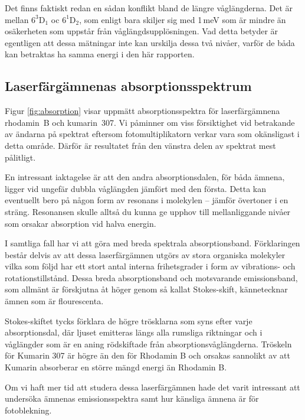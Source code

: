 \documentclass[11pt,a4paper]{article}
\begin{document}
Det finns faktiskt redan en sådan konflikt bland de längre
våglängderna. Det är mellan $6^3\mathrm{D}_1$ oc $6^1\mathrm{D}_2$,
som enligt \cite{NIST_levels} bara skiljer sig med 1\,meV som är
mindre än osäkerheten som uppstår från våglängdsupplösningen. Vad
detta betyder är egentligen att dessa mätningar inte kan urskilja
dessa två nivåer, varför de båda kan betraktas ha samma energi i den
här rapporten. 


\subsection{Laserfärgämnenas absorptionsspektrum}

Figur \ref{fig:absorption} visar uppmätt absorptionsspektra för
laserfärgämnena rhodamin~B och kumarin~307. Vi påminner om viss
försiktighet vid betrakande av ändarna på spektrat eftersom
fotomultiplikatorn verkar vara som okänsligast i detta område. Därför är
resultatet från den vänstra delen av spektrat mest pålitligt. 


En intressant iaktagelse är att den andra absorptionsdalen, för båda
ämnena, ligger vid ungefär dubbla våglängden jämfört med den
första. Detta kan eventuellt bero på någon form av resonans i
molekylen -- jämför övertoner i en sträng. Resonansen skulle alltså du
kunna ge upphov till mellanliggande nivåer som orsakar absorption vid
halva energin. 

I samtliga fall har vi att göra med breda spektrala
absorptionsband. Förklaringen består delvis av att dessa
laserfärgämnen utgörs av stora organiska molekyler vilka som följd har
ett stort antal interna frihetsgrader i form av vibrations- och
rotationstillstånd. Dessa breda absorptionsband och motsvarande
emissionsband, som allmänt är förskjutna åt höger genom så kallat
Stokes-skift, kännetecknar ämnen som är flourescenta. 

Stokes-skiftet tycks förklara de högre trösklarna som syns efter varje
absorptionsdal, där ljuset emitteras längs alla rumsliga riktningar
och i våglängder som är en aning rödskiftade från
absorptionsvåglängderna. Tröskeln för Kumarin 307 är högre än den för
Rhodamin B och orsakas sannolikt av att Kumarin absorberar en större
mängd energi än Rhodamin B. 

Om vi haft mer tid att studera dessa laserfärgämnen hade det varit
intressant att undersöka ämnenas emissionsspektra samt hur känsliga
ämnena är för fotoblekning.
\end{document}
